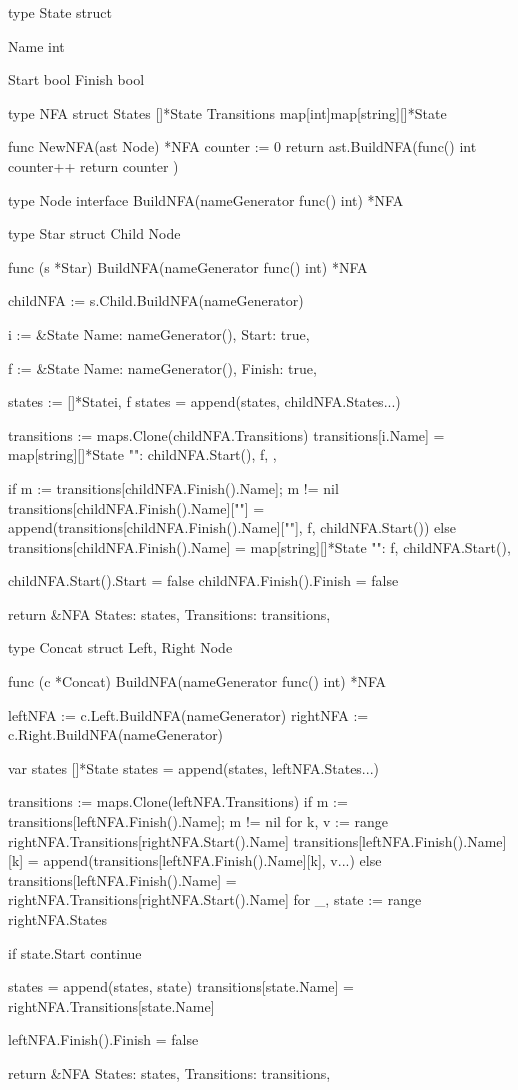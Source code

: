 type State struct {
	Name int

	Start  bool
	Finish bool
}

type NFA struct {
	States      []*State
	Transitions map[int]map[string][]*State
}

func NewNFA(ast Node) *NFA {
	counter := 0
	return ast.BuildNFA(func() int {
		counter++
		return counter
	})
}

type Node interface {
	BuildNFA(nameGenerator func() int) *NFA
}

type Star struct {
	Child Node
}

func (s *Star) BuildNFA(nameGenerator func() int) *NFA {
	childNFA := s.Child.BuildNFA(nameGenerator)

	i := &State{
		Name:  nameGenerator(),
		Start: true,
	}

	f := &State{
		Name:   nameGenerator(),
		Finish: true,
	}

	states := []*State{i, f}
	states = append(states, childNFA.States...)

	transitions := maps.Clone(childNFA.Transitions)
	transitions[i.Name] = map[string][]*State{
		"": {
			childNFA.Start(),
			f,
		},
	}

	if m := transitions[childNFA.Finish().Name]; m != nil {
		transitions[childNFA.Finish().Name][""] = append(transitions[childNFA.Finish().Name][""], f, childNFA.Start())
	} else {
		transitions[childNFA.Finish().Name] = map[string][]*State{
			"": {f, childNFA.Start()},
		}
	}

	childNFA.Start().Start = false
	childNFA.Finish().Finish = false

	return &NFA{
		States:      states,
		Transitions: transitions,
	}
}

type Concat struct {
	Left, Right Node
}

func (c *Concat) BuildNFA(nameGenerator func() int) *NFA {
	leftNFA := c.Left.BuildNFA(nameGenerator)
	rightNFA := c.Right.BuildNFA(nameGenerator)

	var states []*State
	states = append(states, leftNFA.States...)

	transitions := maps.Clone(leftNFA.Transitions)
	if m := transitions[leftNFA.Finish().Name]; m != nil {
		for k, v := range rightNFA.Transitions[rightNFA.Start().Name] {
			transitions[leftNFA.Finish().Name][k] = append(transitions[leftNFA.Finish().Name][k], v...)
		}
	} else {
		transitions[leftNFA.Finish().Name] = rightNFA.Transitions[rightNFA.Start().Name]
	}
	for _, state := range rightNFA.States {
		if state.Start {
			continue
		}

		states = append(states, state)
		transitions[state.Name] = rightNFA.Transitions[state.Name]
	}

	leftNFA.Finish().Finish = false

	return &NFA{
		States:      states,
		Transitions: transitions,
	}
}

